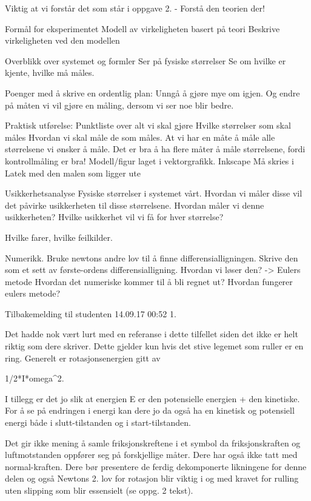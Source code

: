 




Viktig at vi forstår det som står i oppgave 2. - Forstå den teorien der!


Formål for eksperimentet
    Modell av virkeligheten basert på teori
        Beskrive virkeligheten ved den modellen

Overblikk over systemet og formler
    Ser på fysiske størrelser
        Se om hvilke er kjente, hvilke må måles. 

Poenger med å skrive en ordentlig plan: 
    Unngå å gjøre mye om igjen. 
    Og endre på måten vi vil gjøre en måling, dersom vi ser noe blir bedre. 

Praktisk utførelse: 
    Punktliste over alt vi skal gjøre
    Hvilke størrelser som skal måles
        Hvordan vi skal måle de som måles. 
    At vi har en måte å måle alle størrelsene vi ønsker å måle. 
    Det er bra å ha flere måter å måle størrelsene, fordi kontrollmåling er bra! 
    Modell/figur laget i vektorgrafikk. Inkscape
    Må skries i Latek med den malen som ligger ute
    

Usikkerhetsanalyse
    Fysiske størrelser i systemet vårt. 
    Hvordan vi måler disse vil det påvirke usikkerheten til disse størrelsene.
        Hvordan måler vi denne usikkerheten? 
    Hvilke usikkerhet vil vi få for hver størrelse?

    Hvilke farer, hvilke feilkilder. 

Numerikk. 
    Bruke newtons andre lov til å finne differensialligningen. Skrive den som et sett av første-ordens differensialligning. 
    Hvordan vi løser den? -> Eulers metode
    Hvordan det numeriske kommer til å bli regnet ut? 
        Hvordan fungerer eulers metode? 


    
    

    
Tilbakemelding til studenten
14.09.17 00:52
1.

Det hadde nok vært lurt med en referanse i dette tilfellet siden det ikke er helt riktig som dere skriver. Dette gjelder kun hvis det stive legemet som ruller er en ring. Generelt er rotasjonsenergien gitt av

1/2*I*omega^2.

I tillegg er det jo slik at energien E er den potensielle energien + den kinetiske. For å se på endringen i energi kan dere jo da også ha en kinetisk og potensiell energi både i slutt-tilstanden og i start-tilstanden.

Det gir ikke mening å samle friksjonskreftene i et symbol da friksjonskraften og luftmotstanden oppfører seg på forskjellige måter. Dere har også ikke tatt med normal-kraften. Dere bør presentere de ferdig dekomponerte likningene for denne delen og også Newtons 2. lov for rotasjon blir viktig i og med kravet for rulling uten slipping som blir essensielt (se oppg. 2 tekst). 

